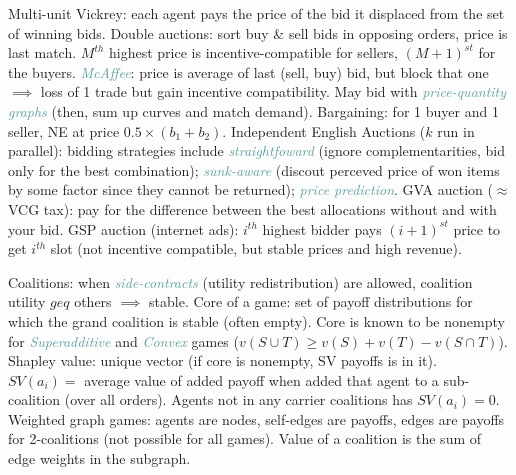 \documentclass[10pt,a4paper,landscape]{article}
\newcommand{\concept}[1]{\textcolor{Emerald}{#1}} %
\newcommand{\subconcept}[1]{\textcolor{CadetBlue}{\textit{#1}}}
\renewcommand{\section}[1]{
    \vspace{-0.3cm}
    \begin{center}
      \color{Bittersweet}
      \hrulefill{\small~~#1~~}\hrulefill
    \end{center}
    \vspace{-0.3cm}
  }
\renewcommand{\subsection}[1]{\section{#1}}
\begin{document}
\begin{multicols*}{4}
\concept{Multi-unit Vickrey}: each agent pays the price of the bid it displaced from the set of winning bids.
\concept{Double auctions}: sort buy \& sell bids in opposing orders, price is last match. $M^{th}$ highest price is incentive-compatible for sellers, $(M+1)^{st}$ for the buyers. \subconcept{McAffee}: price is average of last (sell, buy) bid, but block that one $\implies$ loss of 1 trade but gain incentive compatibility. May bid with \subconcept{price-quantity graphs} (then, sum up curves and match demand).
\concept{Bargaining}: for 1 buyer and 1 seller, NE at price $0.5 \times (b_1 + b_2)$.
\concept{Independent English Auctions} ($k$ run in parallel): bidding strategies include \subconcept{straightfoward} (ignore complementarities, bid only for the best combination); \subconcept{sunk-aware} (discout perceved price of won items by some factor since they cannot be returned); \subconcept{price prediction}.
\concept{GVA auction} ($\approx$ VCG tax): pay for the difference between the best allocations without and with your bid.
\concept{GSP auction} (internet ads): $i^{th}$ highest bidder pays $(i+1)^{st}$ price to get $i^{th}$ slot (not incentive compatible, but stable prices and high revenue).

\subsection{Coalitions}

\concept{Coalitions}: when \subconcept{side-contracts} (utility redistribution) are allowed, coalition utility $geq$ others $\implies$ stable.
\concept{Core} of a game: set of payoff distributions for which the grand coalition is stable (often empty).
Core is known to be nonempty for \subconcept{Superadditive} and \subconcept{Convex} games ($v(S \cup T) \geq v(S) + v(T) - v(S \cap T)$).
\concept{Shapley value}: unique vector (if core is nonempty, SV payoffs is in it). $SV(a_i) = $ average value of added payoff when added that agent to a sub-coalition (over all orders). Agents not in any carrier coalitions has $SV(a_i) = 0$.
\concept{Weighted graph games}: agents are nodes, self-edges are payoffs, edges are payoffs for 2-coalitions (not possible for all games). Value of a coalition is the sum of edge weights in the subgraph.

\subsection{Voting protocols}


\end{multicols*}
\end{document}
